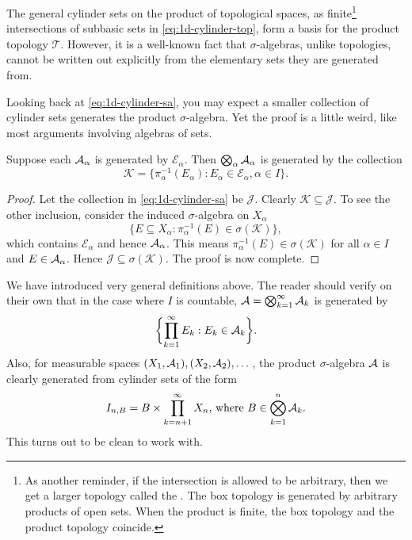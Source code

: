 The general cylinder sets on the product of topological spaces, as finite\footnote{As another reminder, if the intersection is allowed to be arbitrary, then we get a larger topology called the . The box topology is generated by arbitrary products of open sets. When the product is finite, the box topology and the product topology coincide.} intersections of subbasic sets in \eqref{eq:1d-cylinder-top}, form a basis for the product topology $\mathcal{T}$. However, it is a well-known fact that $\sigma$-algebras, unlike topologies, cannot be written out explicitly from the elementary sets they are generated from. %

Looking back at \eqref{eq:1d-cylinder-sa}, you may expect a smaller collection of cylinder sets generates the product $\sigma$-algebra. Yet the proof is a little weird, like most arguments involving algebras of sets.

\begin{prop} \label{prop:prod-s-algebra-generate}
    Suppose each $\mathcal{A}_\alpha$ is generated by $\mathcal{E}_\alpha$. Then $\bigotimes_{\alpha} \mathcal{A}_\alpha$ is generated by the collection \[
        \mathcal{K} = \{\pi_\alpha^{-1} (E_\alpha) : E_\alpha \in \mathcal{E}_\alpha, \alpha \in I\}.
    \]
\end{prop}
\begin{proof}
    Let the collection in \eqref{eq:1d-cylinder-sa} be $\mathcal{J}$. Clearly $\mathcal{K} \subseteq \mathcal{J}$. To see the other inclusion, consider the induced $\sigma$-algebra on $X_\alpha$ \[
        \{E \subseteq X_\alpha : \pi_\alpha^{-1}(E) \in \sigma(\mathcal{K})\},
    \] which contains $\mathcal{E}_\alpha$ and hence $\mathcal{A}_\alpha$. This means $\pi_\alpha^{-1}(E) \in \sigma(\mathcal{K})$ for all $\alpha \in I$ and $E \in \mathcal{A}_\alpha$. Hence $\mathcal{J} \subseteq \sigma(\mathcal{K})$. The proof is now complete.
\end{proof}

We have introduced very general definitions above. The reader should verify on their own that in the case where $I$ is countable, $\mathcal{A} = \bigotimes_{k=1}^\infty \mathcal{A}_k$ is generated by \[
    \biggl\{\prod_{k=1}^\infty E_k :E_k \in \mathcal{A}_k \biggr\}.
\] Also, for measurable spaces $(X_1,\mathcal{A}_1),(X_2,\mathcal{A}_2),\dotsc$, the product $\sigma$-algebra $\mathcal{A}$ is clearly generated from cylinder sets of the form \[
    I_{n,B} = B \times \prod_{k= n+ 1}^\infty X_n\text{, where }B \in \bigotimes_{k=1}^n \mathcal{A}_k.
\] This turns out to be clean to work with.


